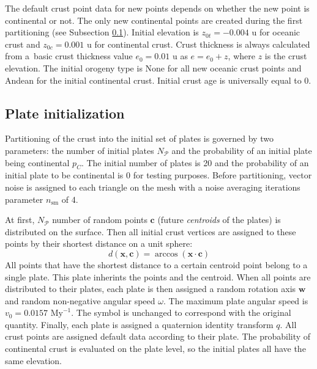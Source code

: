 The default crust point data for new points depends on whether the new point is continental or not. The only new continental points are created during the first partitioning (see Subsection \ref{subsec:plate-initialization}). Initial elevation is $z_{0t}=-0.004 \mbox{ u}$ for oceanic crust and $z_{0c}=0.001 \mbox{ u}$ for continental crust. Crust thickness is always calculated from a~basic crust thickness value $e_0=0.01\mbox{ u}$ as $e=e_0+z$, where $z$ is the crust elevation. The initial orogeny type is None for all new oceanic crust points and Andean for the initial continental crust. Initial crust age is universally equal to 0.
\subsection{Plate initialization}
\label{subsec:plate-initialization}
Partitioning of the crust into the initial set of plates  is governed by two parameters: the number of initial plates $N_\mathcal{P}$ and the probability of an initial plate being continental $p_C$. The initial number of plates is 20 and the probability of an initial plate to be continental is 0 for testing purposes. Before partitioning, vector noise is assigned to each triangle on the mesh with a noise averaging iterations parameter $n_{\mbox{sm}}$ of 4.

At first, $N_\mathcal{P}$ number of random points $\mathbf{c}$ (future \textit{centroids} of the plates) is distributed on the surface. Then all initial crust vertices are assigned to these points by their shortest distance on a unit sphere:
$$d(\mathbf{x},\mathbf{c})=\arccos(\mathbf{x}\cdot\mathbf{c})$$
All points that have the shortest distance to a certain centroid point belong to a single plate. This plate inherints the points and the centroid. When all points are distributed to their plates, each plate is then assigned a random rotation axis $\mathbf{w}$ and random non-negative angular speed $\omega$. The maximum plate angular speed is $v_0=0.0157\mbox{ My}^{-1}$. The symbol is unchanged to correspond with the original quantity. Finally, each plate is assigned a quaternion identity transform $q$. All crust points are assigned default data according to their plate. The probability of continental crust is evaluated on the plate level, so the initial plates all have the same elevation.

